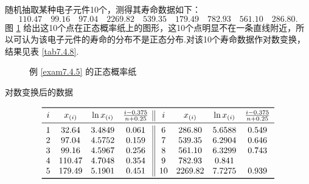 \begin{example}\label{exam7.4.5}
  随机抽取某种电子元件10个，测得其寿命数据如下：
  \[
    110.47\quad 99.16 \quad 97.04\quad 2269.82\quad 539.35\quad 179.49 \quad
    782.93 \quad 561.10 \quad 286.80.
  \]
  图 \ref{fig7.4.3} 给出这10个点在正态概率纸上的图形，这10个点明显不在一条直线附近，所以可认为该电子元件的寿命的分布不是正态分布.对该10个寿命数据作对数变换，结果见表 \ref{tab7.4.8}.

  \begin{figure}[!ht]
    \centering
    \caption{例 \ref{exam7.4.5} 的正态概率纸\label{fig7.4.3}}
  \end{figure}
  \begin{table}[!ht]
    \centering
    \caption{对数变换后的数据}\label{tab7.4.8}
    \[
      \begin{array}{cccc||cccc}
        \toprule
        i & x_{(i)} & \ln x_{(i)} & \frac{i-0.375}{n+0.25} & i & x_{(i)} & \ln x_{(i)} & \frac{i-0.375}{n+0.25} \\
        \midrule
        1 & 32.64 & 3.4849 & 0.061 & 6 & 286.80 & 5.6588 & 0.549 \\
        2 & 97.04 & 4.5752 & 0.159 & 7 & 539.35 & 6.2904 & 0.646 \\
        3 & 99.16 & 4.5967 & 0.256 & 8 & 561.10 & 6.3299 & 0.743 \\
        4 & 110.47 & 4.7048 & 0.354 & 9 & 782.93 & 0.841 \\
        5 & 179.49 & 5.1901 & 0.451 & 10 & 2269.82 & 7.7275 & 0.939 \\
        \bottomrule
      \end{array}
    \]
  \end{table}


\end{example}
